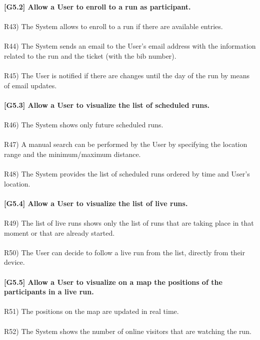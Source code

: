\textbf{[G5.2] Allow a User to enroll to a run as participant.} \\ \\
R43) The System allows to enroll to a run if there are available entries. \\ \\
R44) The System sends an email to the User’s email address with the information related to the run and the ticket (with the bib number). \\ \\
R45) The User is notified if there are changes until the day of the run by means of email updates. \\ \\

\textbf{[G5.3] Allow a User to visualize the list of scheduled runs.} \\ \\
R46) The System shows only future scheduled runs. \\ \\ 
R47) A manual search can be performed by the User by specifying the location range and the minimum/maximum distance. \\ \\ 
R48) The System provides the list of scheduled runs ordered by time and User’s location. \\ \\

\textbf{[G5.4] Allow a User to visualize the list of live runs.} \\ \\
R49) The list of live runs shows only the list of runs that are taking place in that moment or that are already started. \\ \\
R50) The User can decide to follow a live run from the list, directly from their device. \\ \\

\textbf{[G5.5] Allow a User to visualize on a map the positions of the participants in a live run.} \\ \\	
R51) The positions on the map are updated in real time. \\ \\
R52) The System shows the number of online visitors that are watching the run. \\


